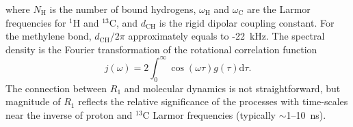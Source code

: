 \documentclass[journal=jpcbfk,manuscript=article,layout=twocolumn]{achemso}
\begin{document}
where $N_{\mathrm{H}}$ is the number of bound hydrogens, $\omega_{\mathrm{H}}$ and $\omega_{\mathrm{C}}$ are the Larmor frequencies
for $^{1}$H and $^{13}$C, and $d_{\mathrm{CH}}$ is the rigid dipolar coupling constant. For the methylene bond, $d_{\mathrm{CH}}/2\pi$ approximately equals to -22~kHz.
The spectral density is the Fourier transformation of the rotational correlation function
\begin{equation}
j{(\omega)}=2\int_{0}^{\infty}\cos(\omega\tau)g(\tau)\mathrm d\tau.
\end{equation}
The connection between $R_1$ and molecular dynamics is not straightforward,
but
magnitude of $R_1$ reflects the relative significance of the processes
with time-scales near the inverse of proton and $^{13}$C Larmor frequencies (typically $\sim$1--10~ns).
\end{document}
